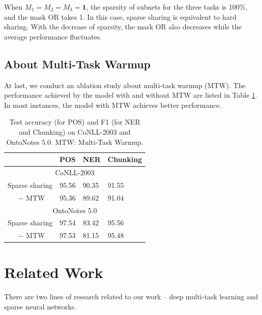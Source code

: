 \documentclass[letterpaper]{article} %
\begin{document}
When $M_1=M_2=M_3=\mathbf{1}$, the sparsity of subnets for the three tasks is 100\%, and the mask OR takes 1. In this case, sparse sharing is equivalent to hard sharing. With the decrease of sparsity, the mask OR also decreases while the average performance fluctuates.

\subsection{About Multi-Task Warmup}
At last, we conduct an ablation study about multi-task warmup (MTW). The performance achieved by the model with and without MTW are listed in Table \ref{tb:warmup}. In most instances, the model with MTW achieves better performance.

\begin{table}[htb]
\centering
\begin{tabular}{llll}
\toprule
 & POS & NER & Chunking \\ \midrule
\multicolumn{4}{c}{CoNLL-2003} \\ \midrule
Sparse sharing & 95.56 & 90.35 & 91.55 \\
\ \ \ $-$ MTW & 95.36 & 89.62 & 91.04 \\ \midrule
\multicolumn{4}{c}{OntoNotes 5.0} \\ \midrule
Sparse sharing & 97.54 & 83.42 & 95.56 \\
\ \ \ $-$ MTW & 97.53 & 81.15 & 95.48 \\ \bottomrule
\end{tabular}
\caption{Test accuracy (for POS) and F1 (for NER and Chunking) on CoNLL-2003 and OntoNotes 5.0. MTW: Multi-Task Warmup.}
\label{tb:warmup}
\end{table}

\section{Related Work}
There are two lines of research related to our work -- deep multi-task learning and sparse neural networks.
\end{document}
